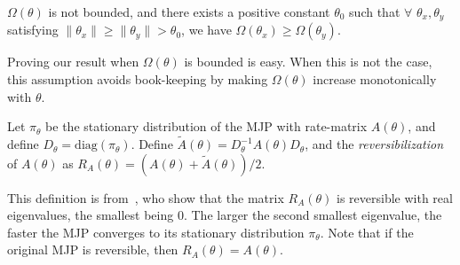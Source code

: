 \begin{assumption}
  $\Omega(\theta)$ is not bounded, and there exists a positive constant $\theta_0$ such that $\forall$ $\theta_x, \theta_y$ satisfying
  $\| \theta_x \| \ge \| \theta_y \| > \theta_0$, we have $\Omega(\theta_x) \ge \Omega(\theta_y)$.  
  \label{asmp:mono_tail}
\end{assumption}
\noindent Proving our result when $\Omega(\theta)$ is bounded is 
easy. %
When this is not the case, this assumption avoids book-keeping by making 
$\Omega(\theta)$ increase monotonically with $\theta$.

\begin{definition}
Let $\pi_\theta$ be the stationary distribution of the MJP with rate-matrix 
$A(\theta)$, and define $D_\theta = \text{diag}(\pi_\theta)$. Define 
$\tilde{A}(\theta) = D_\theta^{-1}A(\theta)D_\theta$, and the 
{\em reversibilization} of $A(\theta)$ as $R_A(\theta) = 
(A(\theta)+\tilde{A}(\theta))/2$. 
\label{def:mjp_symm}
\end{definition}
This definition is from~\cite{fill1991}, who show that the matrix 
$R_A(\theta)$ is reversible with real eigenvalues, the smallest being $0$. 
The larger the second smallest eigenvalue, the faster the MJP converges to its 
stationary distribution $\pi_\theta$.
Note that if the original MJP is reversible, then $R_A(\theta) = A(\theta)$.

